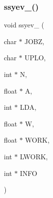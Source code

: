 \mbox{\label{a00476_ae8198e35b3f42d000420a225a16e180d}} 
\subsubsection{\texorpdfstring{ssyev\+\_\+()}{ssyev\_()}}
{\footnotesize\ttfamily void ssyev\+\_\+ (\begin{DoxyParamCaption}\item[{char $\ast$}]{J\+O\+BZ,  }\item[{char $\ast$}]{U\+P\+LO,  }\item[{int $\ast$}]{N,  }\item[{float $\ast$}]{A,  }\item[{int $\ast$}]{L\+DA,  }\item[{float $\ast$}]{W,  }\item[{float $\ast$}]{W\+O\+RK,  }\item[{int $\ast$}]{L\+W\+O\+RK,  }\item[{int $\ast$}]{I\+N\+FO }\end{DoxyParamCaption})}

